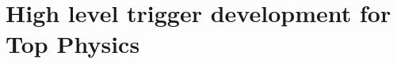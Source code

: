 \chapter{High level trigger development for Top Physics}
\ifpdf
    \graphicspath{{04_Service_work/plots/}}
\else
    \graphicspath{{04_Service_work/plots/EPS/}{04_Service_work/plots/}}
\fi



